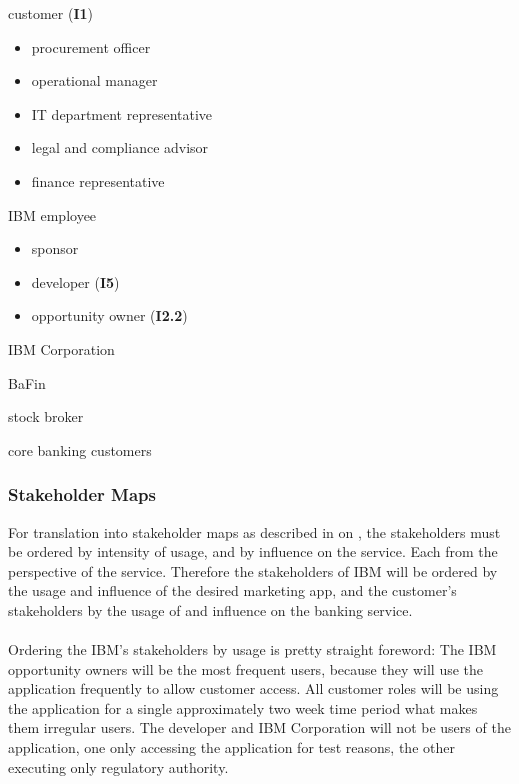 \begin{closeItemCol}
    \item customer (\textbf{I1})
    \begin{itemize}
        \item procurement officer
        \item operational manager
        \item IT department representative
        \item legal and compliance advisor
        \item finance representative
    \end{itemize}
    \item IBM employee 
    \begin{itemize}
        \item sponsor
        \item developer (\textbf{I5})
        \item opportunity owner (\textbf{I2.2})
    \end{itemize}
    \item IBM Corporation
    \columnbreak
    \item BaFin
    \item stock broker
    \item core banking customers
\end{closeItemCol}

\subsubsection{Stakeholder Maps}
For translation into stakeholder maps as described in \Cref{} on \cpageref{}, the stakeholders must be ordered by intensity of usage, and by influence on the service. Each from the perspective of the service. Therefore the stakeholders of IBM will be ordered by the usage and influence of the desired marketing app, and the customer's stakeholders by the usage of and influence on the banking service.

\paragraph{}
Ordering the IBM's stakeholders by usage is pretty straight foreword: The IBM opportunity owners will be the most frequent users, because they will use the application frequently to allow customer access. All customer roles will be using the application for a single approximately two week time period what makes them irregular users.
The developer and IBM Corporation will not be users of the application, one only accessing the application for test reasons, the other executing only regulatory authority. 

